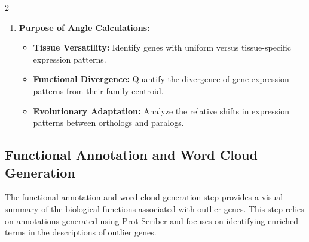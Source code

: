 2\documentclass{article}
\begin{document}
\begin{enumerate}
    \item \textbf{Purpose of Angle Calculations:}
    \begin{itemize}
        \item \textbf{Tissue Versatility:} Identify genes with uniform versus tissue-specific expression patterns.
        \item \textbf{Functional Divergence:} Quantify the divergence of gene expression patterns from their family centroid.
        \item \textbf{Evolutionary Adaptation:} Analyze the relative shifts in expression patterns between orthologs and paralogs.
    \end{itemize}
\end{enumerate}

\subsection{Functional Annotation and Word Cloud Generation}
The functional annotation and word cloud generation step provides a visual summary of the biological functions associated with outlier genes. This step relies on annotations generated using Prot-Scriber and focuses on identifying enriched terms in the descriptions of outlier genes.
\end{document}

